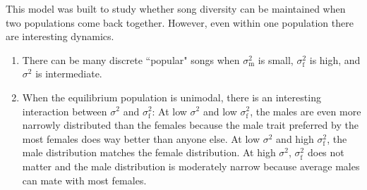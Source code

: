 \documentclass{article}\usepackage[]{graphicx}\usepackage[]{color}
\begin{document}
This model was built to study whether song diversity can be maintained when two populations come back together. However, even within one population there are interesting dynamics.
\begin{enumerate}
\item There can be many discrete ``popular" songs when $\sigma_\text{m}^2$  is small, $\sigma_\text{f}^2$ is high, and $\sigma^2$ is intermediate.
\item When the equilibrium population is unimodal, there is an interesting interaction between $\sigma^2$ and $\sigma_\text{f}^2$: At low $\sigma^2$ and low $\sigma_\text{f}^2$, the males are even more narrowly distributed than the females because the male trait preferred by the most females does way better than anyone else. At low $\sigma^2$ and high $\sigma_\text{f}^2$, the male distribution matches the female distribution. At high $\sigma^2$, $\sigma_\text{f}^2$ does not matter and the male distribution is moderately narrow because average males can mate with most females. 
\end{enumerate}



\end{document}

